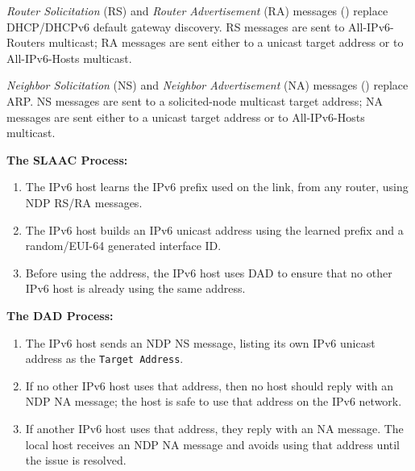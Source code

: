 \documentclass[12pt]{article}
\begin{document}
	\textit{Router Solicitation} (RS) and \textit{Router Advertisement} (RA) messages () replace DHCP/DHCPv6 default gateway discovery. RS messages are sent to All-IPv6-Routers multicast; RA messages are sent either to a unicast target address or to All-IPv6-Hosts multicast.

	\textit{Neighbor Solicitation} (NS) and \textit{Neighbor Advertisement} (NA) messages () replace ARP. NS messages are sent to a solicited-node multicast target address; NA messages are sent either to a unicast target address or to All-IPv6-Hosts multicast.

	\textbf{The SLAAC Process:}
	\begin{enumerate} \itemsep -5pt
		\label{itm:NDP SLAAC}
		\item{The IPv6 host learns the IPv6 prefix used on the link, from any router, using NDP RS/RA messages.}
		\item{The IPv6 host builds an IPv6 unicast address using the learned prefix and a random/EUI-64 generated interface ID.}
		\item{Before using the address, the IPv6 host uses DAD to ensure that no other IPv6 host is already using the same address.}
	\end{enumerate}

	\textbf{The DAD Process:}
	\begin{enumerate} \itemsep -5pt
		\label{itm:NDP DAD}
		\item{The IPv6 host sends an NDP NS message, listing its own IPv6 unicast address as the \texttt{Target Address}.}
		\item{If no other IPv6 host uses that address, then no host should reply with an NDP NA message; the host is safe to use that address on the IPv6 network.}
		\item{If another IPv6 host uses that address, they reply with an NA message. The local host receives an NDP NA message and avoids using that address until the issue is resolved.}
	\end{enumerate}
\end{document}
